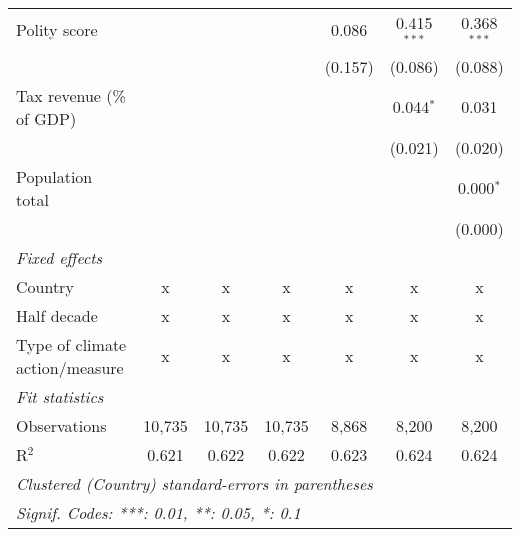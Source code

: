 \begin{tabular}{lcccccc}
   Polity score                                                &         &               &                & 0.086          & 0.415$^{***}$  & 0.368$^{***}$\\   
                                                               &         &               &                & (0.157)        & (0.086)        & (0.088)\\   
   Tax revenue (\% of GDP)                                     &         &               &                &                & 0.044$^{*}$    & 0.031\\   
                                                               &         &               &                &                & (0.021)        & (0.020)\\   
   Population total                                            &         &               &                &                &                & 0.000$^{*}$\\   
                                                               &         &               &                &                &                & (0.000)\\   
   \emph{Fixed effects}\\
   Country                                                     & x       & x             & x              & x              & x              & x\\  
   Half decade                                                 & x       & x             & x              & x              & x              & x\\  
   Type of climate action/measure                              & x       & x             & x              & x              & x              & x\\  
   \midrule \emph{Fit statistics}\\
   Observations                                                & 10,735  & 10,735        & 10,735         & 8,868          & 8,200          & 8,200\\  
   R$^2$                                                       & 0.621   & 0.622         & 0.622          & 0.623          & 0.624          & 0.624\\  
   \midrule
   \multicolumn{7}{l}{\emph{Clustered (Country) standard-errors in parentheses}}\\
   \multicolumn{7}{l}{\emph{Signif. Codes: ***: 0.01, **: 0.05, *: 0.1}}\\
\end{tabular}
\par\endgroup


